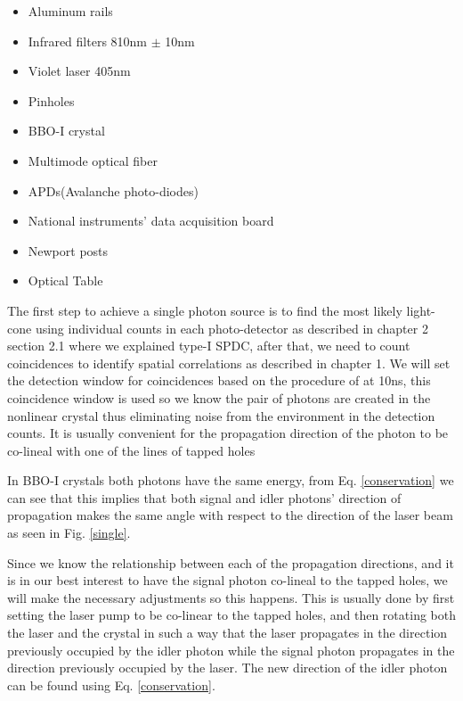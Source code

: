 \documentclass{book}
\begin{document}
\begin{itemize}

\item Aluminum rails
\item Infrared filters 810nm $\pm$ 10nm
\item Violet laser 405nm
\item Pinholes
\item BBO-I crystal
\item Multimode optical fiber
\item APDs(Avalanche photo-diodes)
\item National instruments' data acquisition board
\item Newport posts
\item Optical Table

\end{itemize}

The first step to achieve a single photon source is to find the most likely light-cone using individual counts in each photo-detector as described in chapter 2 section 2.1 where we explained type-I SPDC, after that, we need to count coincidences to identify spatial correlations as described in chapter 1. We will set the detection window for coincidences based on the procedure of \cite{pearson} at 10ns, this coincidence window is used so we know the pair of photons are created in the nonlinear crystal thus eliminating noise from the environment in the detection counts. It is usually convenient for the propagation direction of the photon to be co-lineal with one of the lines of tapped holes

In BBO-I crystals both photons have the same energy, from Eq. \ref{conservation} we can see that this implies that both signal and idler photons' direction of propagation makes the same angle with respect to the direction of the laser beam as seen in Fig. \ref{single}.

Since we know the relationship between each of the propagation directions, and it is in our best interest to have the signal photon co-lineal to the tapped holes, we will make the necessary adjustments so this happens. This is usually done by first setting the laser pump to be co-linear to the tapped holes, and then rotating both the laser and the crystal in such a way that the laser propagates in the direction previously occupied by the idler photon while the signal photon propagates in the direction previously occupied by the laser. The new direction of the idler photon can be found using Eq. \ref{conservation}.
\end{document}
